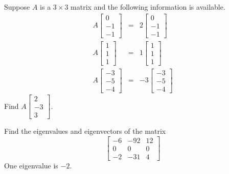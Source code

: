 \documentclass{ximera}
\begin{document}
\begin{problem}\label{prb:8.8} Suppose $A$ is a $3\times 3$ matrix and the following information is
available.
\begin{eqnarray*}
A\left[
\begin{array}{r}
0 \\
-1 \\
-1
\end{array}
\right] &=&2\left[
\begin{array}{r}
0 \\
-1 \\
-1
\end{array}
\right] \\
A\left[
\begin{array}{r}
1 \\
1 \\
1
\end{array}
\right] &=& 1\left[
\begin{array}{r}
1 \\
1 \\
1
\end{array}
\right] \\
A\left[
\begin{array}{r}
-3 \\
-5 \\
-4
\end{array}
\right] &=&-3\left[
\begin{array}{r}
-3 \\
-5 \\
-4
\end{array}
\right]
\end{eqnarray*}
Find $A\left[
\begin{array}{r}
2 \\
-3 \\
3
\end{array}
\right]. $ \vspace{1mm}
\end{problem}

\begin{problem}\label{prb:8.9} Find the eigenvalues and eigenvectors of the matrix
\begin{equation*}
\left[
\begin{array}{rrr}
-6 & -92 & 12 \\
0 & 0 & 0 \\
-2 & -31 & 4
\end{array}
\right]
\end{equation*}
One eigenvalue is $-2$.
\end{problem}
\end{document}
